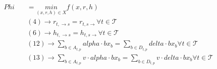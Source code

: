 \begin{align}
  \mathit{Phi}\quad & = \underset{\left(x , r , h\right) \in X}{min} f \left(x , r , h\right) \tag{eq\_0018} \\
  & (\text{4}) \rightarrow r_{t , \rightarrow s} = r_{t , s \rightarrow} \forall t \in \mathcal{T} \tag{eq\_0027} \\
  & (\text{6}) \rightarrow h_{t , \rightarrow s} = h_{t , s \rightarrow} \forall t \in \mathcal{T} \tag{eq\_0029} \\
  & (\text{12}) \rightarrow \sum_{b \in A_{t , p}} \mathit{alpha} \cdot b x_{b} = \sum_{b \in D_{t , p}} \mathit{delta} \cdot b x_{b} \forall t \in \mathcal{T} \tag{eq\_0030} \\
  & (\text{13}) \rightarrow \sum_{b \in A_{t , p}} v \cdot \mathit{alpha} \cdot b x_{b} = \sum_{b \in D_{t , p}} v \cdot \mathit{delta} \cdot b x_{b} \forall t \in \mathcal{T} \tag{eq\_0031} \\
\end{align}
